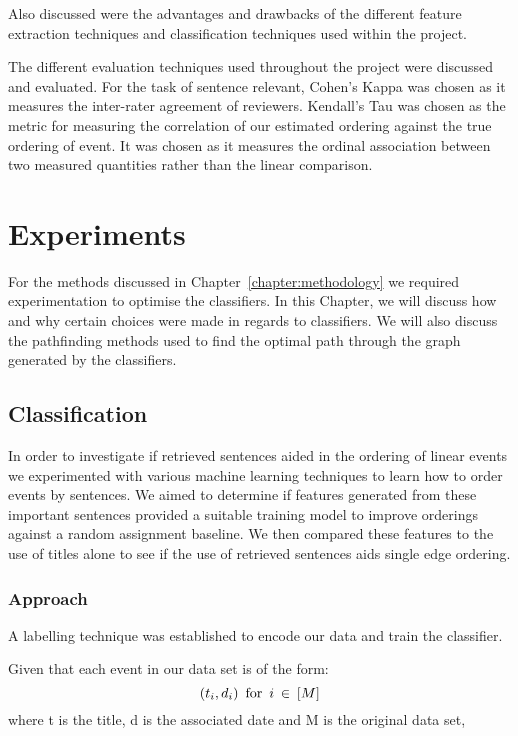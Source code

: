 \documentclass[bsc,frontabs,twoside,singlespacing,parskip,deptreport]{infthesis}     %
\begin{document}
Also discussed were the advantages and drawbacks of the different feature extraction techniques and classification
techniques used within the project.

The different evaluation techniques used throughout the project were discussed and evaluated. 
For the task of sentence relevant, Cohen's Kappa \cite{wood2007understanding} was chosen as it measures the inter-rater agreement of
reviewers. Kendall's Tau \cite{abdi2007kendall} was chosen as the metric for measuring the correlation of our estimated ordering
against the true ordering of event. It was chosen as it measures the ordinal association between two
measured quantities rather than the linear comparison.


\chapter{Experiments}
For the methods discussed in Chapter~\ref{chapter:methodology} we required experimentation to optimise the classifiers.
In this Chapter, we will discuss how and why certain choices were made in regards to classifiers.
We will also discuss the pathfinding methods used to find the optimal path through the graph generated by the
classifiers.

\section{Classification}
In order to investigate if retrieved sentences aided in the  ordering of linear events we experimented with various
machine learning techniques to learn how to order events by sentences.
We aimed to determine if features generated from these important sentences provided a suitable training model
to improve orderings against a random assignment baseline. We then compared these features to the use of titles alone
to see if the use of retrieved sentences aids single edge ordering.


\subsection{Approach}\label{sec:approach}
A labelling technique was established to encode our data and train the classifier.

Given that each event in our data set is of the form:
\begin{equation}
  (t_{i},d_{i}) \hspace{0.5em} \text{for} \hspace{0.5em} i \hspace{0.2em}\in \hspace{0.2em} [M]\nonumber
    \end{equation}
    where t is the title, d is the associated date and M is the original data set,
\end{document}
